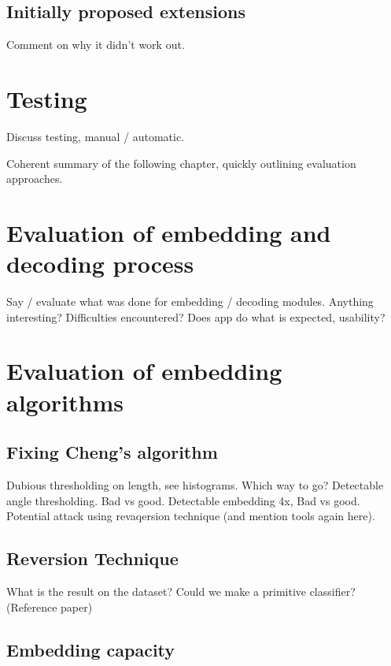 \documentclass[12pt,british,twoside,notitlepage,usenames,dvipsnames,hypens,final]{report}
\numberwithin{equation}{section}
\numberwithin{figure}{section}
\begin{document}
\subsection{Initially proposed extensions}
Comment on why it didn't work out.


\section{Testing}

Discuss testing, manual / automatic.


Coherent summary of the following chapter, quickly outlining evaluation approaches.

\section{Evaluation of embedding and decoding process}

Say / evaluate what was done for embedding / decoding modules. Anything interesting? Difficulties encountered? Does app do what is expected, usability?

\section{Evaluation of embedding algorithms}

\subsection{Fixing Cheng's algorithm}

Dubious thresholding on length, see histograms. Which way to go?
Detectable angle thresholding. Bad vs good.
Detectable embedding 4x, Bad vs good.
Potential attack using revaqersion technique (and mention tools again here).

\subsection{Reversion Technique}

What is the result on the dataset? Could we make a primitive classifier? (Reference paper)

\subsection{Embedding capacity}
\end{document}
